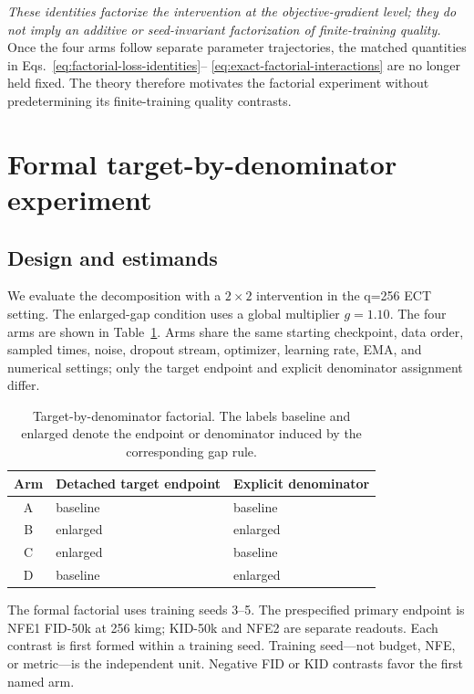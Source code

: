 \documentclass{article}
\begin{document}
\emph{These identities factorize the intervention at the objective-gradient
level; they do not imply an additive or seed-invariant factorization of
finite-training quality.}
Once the four arms follow separate parameter trajectories, the matched
quantities in Eqs.~\eqref{eq:factorial-loss-identities}--
\eqref{eq:exact-factorial-interactions} are no longer held fixed. The theory
therefore motivates the factorial experiment without predetermining its
finite-training quality contrasts.

\section{Formal target-by-denominator experiment}
\label{sec:factorial-experiment}

\subsection{Design and estimands}

We evaluate the decomposition with a $2\times2$ intervention in the q=256
ECT setting. The enlarged-gap condition uses a global multiplier $g=1.10$.
The four arms are shown in Table~\ref{tab:arms}. Arms share the same starting
checkpoint, data order, sampled times, noise, dropout stream, optimizer,
learning rate, EMA, and numerical settings; only the target endpoint and
explicit denominator assignment differ.

\begin{table}[t]
  \caption{Target-by-denominator factorial. The labels baseline and enlarged
  denote the endpoint or denominator induced by the corresponding gap rule.}
  \label{tab:arms}
  \centering
  \begin{tabular}{cll}
    \toprule
    Arm & Detached target endpoint & Explicit denominator \\
    \midrule
    A & baseline & baseline \\
    B & enlarged & enlarged \\
    C & enlarged & baseline \\
    D & baseline & enlarged \\
    \bottomrule
  \end{tabular}
\end{table}

The formal factorial uses training seeds 3--5. The prespecified primary
endpoint is NFE1 FID-50k at 256 kimg; KID-50k and NFE2 are separate readouts.
Each contrast is first formed within a training seed. Training seed---not
budget, NFE, or metric---is the independent unit. Negative FID or KID
contrasts favor the first named arm.
\end{document}
